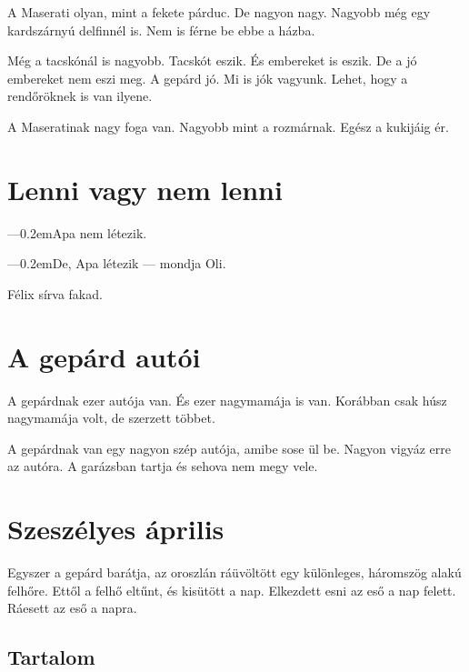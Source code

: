 \documentclass[12pt]{memoir}
\def\dash{---\kern 0.2em}
\newcommand{\beforesection}{\vspace*{0.25\textheight}}
\begin{document}
A Maserati olyan, mint a fekete párduc. De nagyon nagy. Nagyobb még egy
kardszárnyú delfinnél is. Nem is férne be ebbe a házba.

Még a tacskónál is nagyobb. Tacskót eszik. És embereket is eszik. De a jó
embereket nem eszi meg. A gepárd jó. Mi is jók vagyunk. Lehet, hogy a
rendőröknek is van ilyene.

A Maseratinak nagy foga van. Nagyobb mint a rozmárnak. Egész a kukijáig ér.
\cleartoverso


\section{Lenni vagy nem lenni}
\dash Apa nem létezik.

\dash De, Apa létezik — mondja Oli.

Félix sírva fakad.
\cleartoverso


\section{A gepárd autói}
A gepárdnak ezer autója van. És ezer nagymamája is van. Korábban csak húsz
nagymamája volt, de szerzett többet.

A gepárdnak van egy nagyon szép autója, amibe sose ül be. Nagyon vigyáz erre az
autóra. A garázsban tartja és sehova nem megy vele.
\cleartoverso


\section{Szeszélyes április}
Egyszer a gepárd barátja, az oroszlán ráüvöltött egy különleges, háromszög
alakú felhőre. Ettől a felhő eltűnt, és kisütött a nap. Elkezdett esni az eső a
nap felett. Ráesett az eső a napra.
\cleartoverso


\begin{KeepFromToc}
\makeatletter
\renewcommand*{\@tocmaketitle}{}
\makeatother
\renewcommand{\beforesection}{\cleartorecto}
\section*{Tartalom}
\tableofcontents
\end{KeepFromToc}
\end{document}
